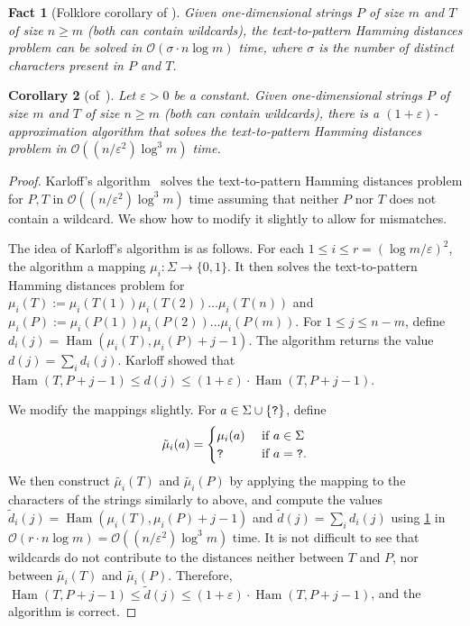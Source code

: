 \documentclass[11pt, letterpaper]{article}
\theoremstyle{plain}
\newtheorem{fact}{Fact}
\newtheorem{corollary}[fact]{Corollary}
\theoremstyle{definition}
\theoremstyle{remark}
\renewcommand{\O}{\mathcal{O}}
\DeclareMathOperator*{\Ham}{Ham}
\begin{document}
\begin{fact}[Folklore corollary of \cite{CLIFFORD200753}]\label{fact:sigman1d}
Given one-dimensional strings $P$ of size $m$ and $T$ of size $n \ge m$ (both can contain wildcards), the text-to-pattern Hamming distances problem can be solved in $\O(\sigma \cdot n \log m)$ time, where $\sigma$ is the number of distinct characters present in $P$ and $T$.
\end{fact}

\begin{corollary}[of~\cite{Karloff1993}]\label{cor:approx1d}
Let $\varepsilon > 0$ be a constant. Given one-dimensional strings $P$ of size $m$ and $T$ of size $n \ge m$ (both can contain wildcards), there is a $(1+\varepsilon)$-approximation algorithm that solves the text-to-pattern Hamming distances problem in $\O((n/\varepsilon^2)  \log^3 m)$ time.
\end{corollary}
\begin{proof}
Karloff's algorithm~\cite{Karloff1993} solves the text-to-pattern Hamming distances problem for $P,T$ in $\O((n/\varepsilon^2)  \log^3 m)$ time assuming that neither $P$ nor $T$ does not contain a wildcard. We show how to modify it slightly to allow for mismatches. 

The idea of Karloff's algorithm is as follows. For each $1 \le i \le r = (\log m/ \varepsilon)^2$, the algorithm a mapping $\mu_i : \Sigma \rightarrow \{0,1\}$. It then solves the text-to-pattern Hamming distances problem for $\mu_i(T) := \mu_i(T(1))\mu_i(T(2)) \ldots \mu_i(T(n))$ and $\mu_i(P) := \mu_i(P(1))\mu_i(P(2)) \ldots \mu_i(P(m))$. For $1 \le j \le n-m$, define $d_i(j) = \Ham(\mu_i(T), \mu_i(P)+j-1)$. The algorithm returns the value $d(j) = \sum_i d_i(j)$. Karloff showed that $\Ham(T, P+j-1) \le d(j) \le (1+\varepsilon) \cdot \Ham(T, P+j-1)$.

We modify the mappings slightly. For $a \in \Sigma \cup \{\texttt{?}\}$, define
$$
\tilde{\mu}_i(a) = 
\begin{cases}
\mu_i(a) &\text{ if } a \in \Sigma\\
\texttt{?} & \text{ if } a = \texttt{?}.
\end{cases}
$$
We then construct $\tilde{\mu_i}(T)$ and $\tilde{\mu_i}(P)$ by applying the mapping to the characters of the strings similarly to above, and compute the values $\tilde{d}_i(j) = \Ham(\mu_i(T), \mu_i(P)+j-1)$ and $\tilde{d}(j) = \sum_i d_i(j)$ using \cref{fact:sigman1d} in $\O(r \cdot n \log m) = \O((n/\varepsilon^2) \log^3 m)$ time. It is not difficult to see that wildcards do not contribute to the distances neither between $T$ and $P$, nor between $\tilde{\mu_i}(T)$ and $\tilde{\mu_i}(P)$. Therefore, $\Ham(T, P+j-1) \le \tilde{d}(j) \le (1+\varepsilon) \cdot \Ham(T, P+j-1)$, and the algorithm is correct. 
\end{proof}
\end{document}
